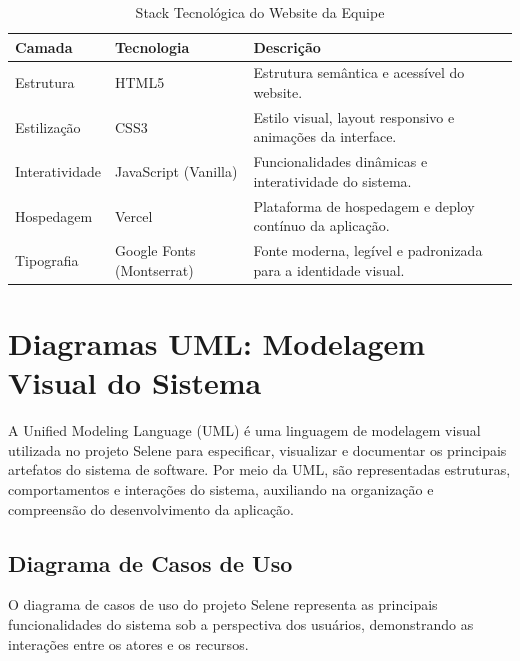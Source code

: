 \documentclass[11pt,a4paper]{article}
\begin{document}
\begin{table}[H]
\centering
\caption{Stack Tecnológica do Website da Equipe}
\label{tab:stack-web}
\renewcommand{\arraystretch}{1.3}
\small

\begin{tabular}{|p{3cm}|p{3.5cm}|p{7cm}|}
\hline
\textbf{Camada} & \textbf{Tecnologia} & \textbf{Descrição} \\
\hline

Estrutura & HTML5 & Estrutura semântica e acessível do website. \\
\hline

Estilização & CSS3 & Estilo visual, layout responsivo e animações da interface. \\
\hline

Interatividade & JavaScript (Vanilla) & Funcionalidades dinâmicas e interatividade do sistema. \\
\hline

Hospedagem & Vercel & Plataforma de hospedagem e deploy contínuo da aplicação. \\
\hline

Tipografia & Google Fonts (Montserrat) & Fonte moderna, legível e padronizada para a identidade visual. \\
\hline

\end{tabular}
\end{table}

\section{Diagramas UML: Modelagem Visual do Sistema}

A Unified Modeling Language (UML) é uma linguagem de modelagem visual utilizada no projeto Selene para especificar, visualizar e documentar os principais artefatos do sistema de software. Por meio da UML, são representadas estruturas, comportamentos e interações do sistema, auxiliando na organização e compreensão do desenvolvimento da aplicação.

\subsection{Diagrama de Casos de Uso}

O diagrama de casos de uso do projeto Selene representa as principais funcionalidades do sistema sob a perspectiva dos usuários, demonstrando as interações entre os atores e os recursos.
\end{document}
